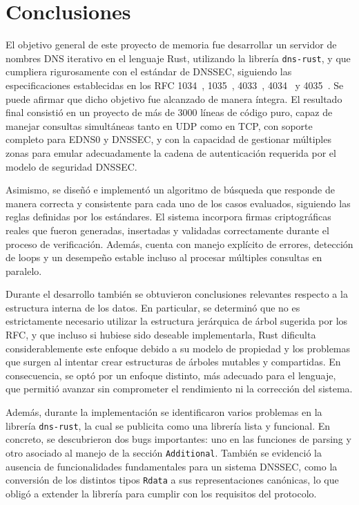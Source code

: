 \chapter{Conclusiones}

El objetivo general de este proyecto de memoria fue desarrollar un servidor de nombres DNS iterativo en el lenguaje Rust, utilizando la librería \texttt{dns-rust}, y que cumpliera 
rigurosamente con el estándar de DNSSEC, siguiendo las especificaciones establecidas en los RFC 1034~\cite{RFC1034}, 1035~\cite{RFC1035}, 4033~\cite{RFC4033}, 4034~\cite{RFC4034} y 4035~\cite{RFC4035}. 
Se puede afirmar que dicho objetivo fue alcanzado de manera íntegra. El resultado final consistió en un proyecto de más de 3000 líneas de código puro, capaz de manejar consultas 
simultáneas tanto en UDP como en TCP, con soporte completo para EDNS0 y DNSSEC, y con la capacidad de gestionar múltiples zonas para emular adecuadamente la cadena de autenticación requerida 
por el modelo de seguridad DNSSEC.

Asimismo, se diseñó e implementó un algoritmo de búsqueda que responde de manera correcta y consistente para cada uno de los casos evaluados, siguiendo las reglas definidas por los estándares. 
El sistema incorpora firmas criptográficas reales que fueron generadas, insertadas y validadas correctamente durante el proceso de verificación. Además, cuenta con manejo explícito de errores, 
detección de loops y un desempeño estable incluso al procesar múltiples consultas en paralelo.

Durante el desarrollo también se obtuvieron conclusiones relevantes respecto a la estructura interna de los datos. En particular, se determinó que no es estrictamente necesario utilizar la 
estructura jerárquica de árbol sugerida por los RFC, y que incluso si hubiese sido deseable implementarla, Rust dificulta considerablemente este enfoque debido a su modelo de propiedad y los 
problemas que surgen al intentar crear estructuras de árboles mutables y compartidas. En consecuencia, se optó por un enfoque distinto, más adecuado para el lenguaje, que permitió avanzar sin 
comprometer el rendimiento ni la corrección del sistema.

Además, durante la implementación se identificaron varios problemas en la librería \texttt{dns-rust}, la cual se publicita como una librería lista y funcional. En concreto, se descubrieron 
dos bugs importantes: uno en las funciones de parsing y otro asociado al manejo de la sección \texttt{Additional}. También se evidenció la ausencia de funcionalidades fundamentales para un 
sistema DNSSEC, como la conversión de los distintos tipos \texttt{Rdata} a sus representaciones canónicas, lo que obligó a extender la librería para cumplir con los requisitos del protocolo.

